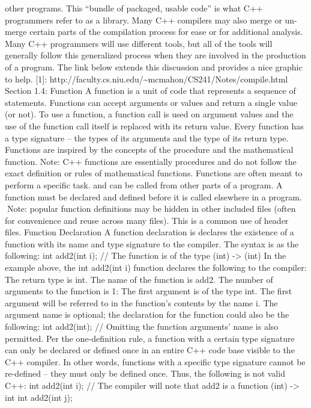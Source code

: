 {other programs. This ``bundle of packaged, usable code'' is what C++
programmers refer to as a library. Many C++ compilers may also merge or
un-merge certain parts of the compilation process for ease or for
additional analysis. Many C++ programmers will use diﬀerent tools, but
all of the tools will generally follow this generalized process when
they are involved in the production of a program. The link below extends
this discussion and provides a nice graphic to help. {[}1{]}:
http://faculty.cs.niu.edu/\textasciitilde mcmahon/CS241/Notes/compile.html
Section 1.4: Function A function is a unit of code that represents a
sequence of statements. Functions can accept arguments or values and
return a single value (or not). To use a function, a function call is
used on argument values and the use of the function call itself is
replaced with its return value. Every function has a type signature --
the types of its arguments and the type of its return type. Functions
are inspired by the concepts of the procedure and the mathematical
function. Note: C++ functions are essentially procedures and do not
follow the exact deﬁnition or rules of mathematical functions. Functions
are often meant to perform a speciﬁc task. and can be called from other
parts of a program. A function must be declared and deﬁned before it is
called elsewhere in a program. Note: popular function deﬁnitions may be
hidden in other included ﬁles (often for convenience and reuse across
many ﬁles). This is a common use of header ﬁles. Function Declaration A
function declaration is declares the existence of a function with its
name and type signature to the compiler. The syntax is as the following:
int add2(int i); // The function is of the type (int) -\textgreater{}
(int) In the example above, the int add2(int i) function declares the
following to the compiler: The return type is int. The name of the
function is add2. The number of arguments to the function is 1: The ﬁrst
argument is of the type int. The ﬁrst argument will be referred to in
the function's contents by the name i. The argument name is optional;
the declaration for the function could also be the following: int
add2(int); // Omitting the function arguments' name is also permitted.
Per the one-deﬁnition rule, a function with a certain type signature can
only be declared or deﬁned once in an entire C++ code base visible to
the C++ compiler. In other words, functions with a speciﬁc type
signature cannot be re-deﬁned -- they must only be deﬁned once. Thus,
the following is not valid C++: int add2(int i); // The compiler will
note that add2 is a function (int) -\textgreater{} int int add2(int j);
}
